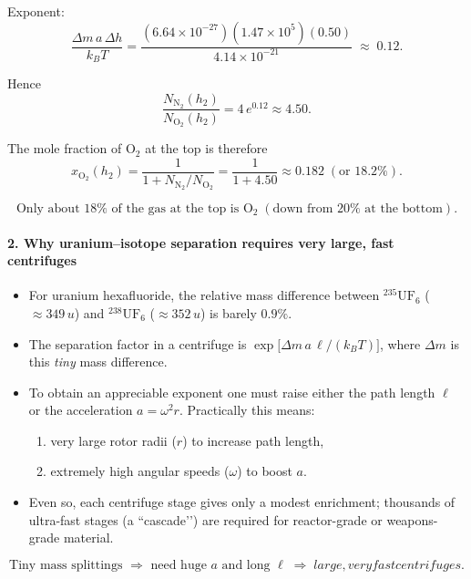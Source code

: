 \documentclass[12pt]{article}
\theoremstyle{definition} %
\theoremstyle{plain} %
\begin{document}
Exponent:
\[
  \frac{\Delta m\,a\,\Delta h}{k_B T}
  = \frac{(6.64\times10^{-27})(1.47\times10^{5})(0.50)}
         {4.14\times10^{-21}}
  \;\approx\; 0.12.
\]

Hence
\[
  \frac{N_{\mathrm{N_2}}(h_2)}{N_{\mathrm{O_2}}(h_2)}
  = 4\,e^{0.12}
  \approx 4.50.
\]

The mole fraction of \(\mathrm{O_2}\) at the top is therefore
\[
  x_{\mathrm{O_2}}(h_2)
  = \frac{1}{1 + N_{\mathrm{N_2}}/N_{\mathrm{O_2}}}
  = \frac{1}{1+4.50}
  \approx 0.182 \;(\text{or }18.2\%).
\]

\[
  \boxed{\text{Only about }18\%\text{ of the gas at the top is } \mathrm{O_2}\;
          (\text{down from }20\%\text{ at the bottom}).}
\]

\paragraph{2.  Why uranium–isotope separation requires very large, fast centrifuges}

\begin{itemize}
  \item For uranium hexafluoride, the relative mass difference between
        \(\mathrm{^{235}UF_6}\) (\(\approx349\,u\)) and
        \(\mathrm{^{238}UF_6}\) (\(\approx352\,u\))
        is barely \(0.9\%\).
  \item The separation factor in a centrifuge is
        \(\displaystyle
          \exp\!\bigl[\Delta m\,a\,\ell/(k_B T)\bigr]\),
        where \(\Delta m\) is this \emph{tiny} mass difference.
  \item To obtain an appreciable exponent one must raise either
        the path length \(\ell\) or the acceleration \(a = \omega^{2}r\).
        Practically this means:
        \begin{enumerate}
          \item very large rotor radii (\(r\)) to increase path length,
          \item extremely high angular speeds (\(\omega\)) to boost \(a\).
        \end{enumerate}
  \item Even so, each centrifuge stage gives only a modest enrichment;
        thousands of ultra-fast stages (a “cascade’’) are required for
        reactor-grade or weapons-grade material.
\end{itemize}

\[
  \boxed{\text{Tiny mass splittings }\Rightarrow\text{ need huge }a\text{ and long }\ell
         \;\Rightarrow\; large, very fast centrifuges.}
\]
\end{document}
